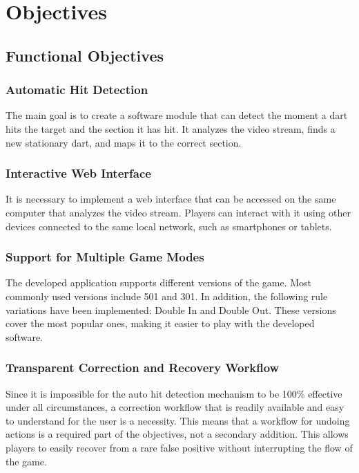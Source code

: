 \section{Objectives}

\subsection{Functional Objectives}

\subsubsection{Automatic Hit Detection}

The main goal is to create a software module that can detect the moment a dart hits the target and the section it has hit. It analyzes the video stream, finds a new stationary dart, and maps it to the correct section.

\subsubsection{Interactive Web Interface}

It is necessary to implement a web interface that can be accessed on the same computer that analyzes the video stream. Players can interact with it using other devices connected to the same local network, such as smartphones or tablets.

\subsubsection{Support for Multiple Game Modes}

The developed application supports different versions of the game. Most commonly used versions include 501 and 301. In addition, the following rule variations have been implemented: Double In and Double Out. These versions cover the most popular ones, making it easier to play with the developed software.

\subsubsection{Transparent Correction and Recovery Workflow}

Since it is impossible for the auto hit detection mechanism to be 100\% effective under all circumstances, a correction workflow that is readily available and easy to understand for the user is a necessity. This means that a workflow for undoing actions is a required part of the objectives, not a secondary addition. This allows players to easily recover from a rare false positive without interrupting the flow of the game.


